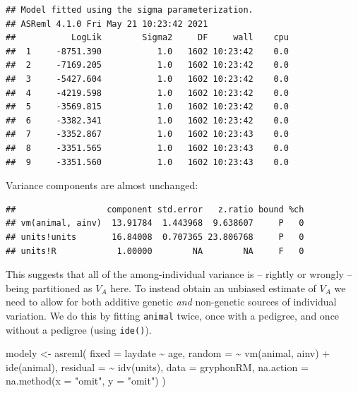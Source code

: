 \documentclass[
  12pt,
]{book}
\newenvironment{Shaded}{\begin{snugshade}}{\end{snugshade}}
\newcommand{\AttributeTok}[1]{\textcolor[rgb]{0.77,0.63,0.00}{#1}}
\newcommand{\FunctionTok}[1]{\textcolor[rgb]{0.00,0.00,0.00}{#1}}
\newcommand{\NormalTok}[1]{#1}
\newcommand{\OtherTok}[1]{\textcolor[rgb]{0.56,0.35,0.01}{#1}}
\newcommand{\SpecialCharTok}[1]{\textcolor[rgb]{0.00,0.00,0.00}{#1}}
\newcommand{\StringTok}[1]{\textcolor[rgb]{0.31,0.60,0.02}{#1}}
\begin{document}
\begin{verbatim}
## Model fitted using the sigma parameterization.
## ASReml 4.1.0 Fri May 21 10:23:42 2021
##           LogLik        Sigma2     DF     wall    cpu
##  1     -8751.390           1.0   1602 10:23:42    0.0
##  2     -7169.205           1.0   1602 10:23:42    0.0
##  3     -5427.604           1.0   1602 10:23:42    0.0
##  4     -4219.598           1.0   1602 10:23:42    0.0
##  5     -3569.815           1.0   1602 10:23:42    0.0
##  6     -3382.341           1.0   1602 10:23:42    0.0
##  7     -3352.867           1.0   1602 10:23:43    0.0
##  8     -3351.565           1.0   1602 10:23:43    0.0
##  9     -3351.560           1.0   1602 10:23:43    0.0
\end{verbatim}

Variance components are almost unchanged:

\begin{Shaded}
\end{Shaded}

\begin{verbatim}
##                  component std.error   z.ratio bound %ch
## vm(animal, ainv)  13.91784  1.443968  9.638607     P   0
## units!units       16.84008  0.707365 23.806768     P   0
## units!R            1.00000        NA        NA     F   0
\end{verbatim}

This suggests that all of the among-individual variance is -- rightly or wrongly -- being partitioned as \(V_A\) here. To instead obtain an unbiased estimate of \(V_A\) we need to allow for both additive genetic \emph{and} non-genetic sources of individual variation. We do this by fitting \texttt{animal} twice, once with a pedigree, and once without a pedigree (using \texttt{ide()}).

\begin{Shaded}
\begin{Highlighting}[]
\NormalTok{modely }\OtherTok{\textless{}{-}} \FunctionTok{asreml}\NormalTok{(}
  \AttributeTok{fixed =}\NormalTok{ laydate }\SpecialCharTok{\textasciitilde{}}\NormalTok{ age,}
  \AttributeTok{random =} \SpecialCharTok{\textasciitilde{}} \FunctionTok{vm}\NormalTok{(animal, ainv) }\SpecialCharTok{+} \FunctionTok{ide}\NormalTok{(animal),}
  \AttributeTok{residual =} \SpecialCharTok{\textasciitilde{}} \FunctionTok{idv}\NormalTok{(units),}
  \AttributeTok{data =}\NormalTok{ gryphonRM,}
  \AttributeTok{na.action =} \FunctionTok{na.method}\NormalTok{(}\AttributeTok{x =} \StringTok{"omit"}\NormalTok{, }\AttributeTok{y =} \StringTok{"omit"}\NormalTok{)}
\NormalTok{)}
\end{Highlighting}
\end{Shaded}
\end{document}
